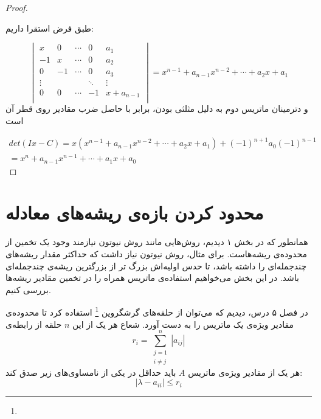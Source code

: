 \begin{proof}
\begin{equation}
  \end{equation}

  طبق فرض استقرا داریم:

  \begin{equation}
    \begin{vmatrix}
      x & 0 & \cdots & 0 & a_1 \\
      -1 & x & \cdots & 0 & a_2 \\
      0 & -1 & \cdots & 0 & a_3 \\
      \vdots &  &  & \ddots & \vdots \\
      0 & 0 & \cdots & -1 & x + a_{n-1} \\
    \end{vmatrix}
    = x^{n-1} + a_{n-1}x^{n-2} + \cdots + a_2 x + a_1
  \end{equation}
  و دترمینان ماتریس دوم به دلیل مثلثی بودن، برابر با حاصل ضرب مقادیر روی قطر آن است

  \begin{equation}
    \begin{split}
        det(Ix - C) = x (x^{n-1} + a_{n-1}x^{n-2} + \cdots + a_2 x + a_1) + (-1)^{n + 1} a_0 (-1)^{n-1} \\
        = x^n + a_{n-1} x^{n-1} + \cdots + a_1x + a_0
    \end{split}
  \end{equation}

\end{proof}


\section{محدود کردن بازه‌ی ریشه‌های معادله}

همانطور که در بخش ۱ دیدیم، روش‌هایی مانند روش نیوتون نیازمند وجود یک تخمین از محدوده‌ی ریشه‌هاست.
برای مثال، روش نیوتون نیاز داشت که حداکثر مقدار ریشه‌های چندجمله‌ای را داشته باشد، تا حدس اولیه‌اش بزرگ تر از بزرگترین ریشه‌ی چندجمله‌ای باشد.
در این بخش می‌خواهیم استفاده‌ی ماتریس همراه را در تخمین مقادیر ریشه‌ها بررسی کنیم.

در فصل ۵ درس، دیدیم که می‌توان از حلقه‌های گرشگروین
\footnote{}
استفاده کرد تا محدوده‌ی مقادیر ویژه‌ی یک ماتریس را به دست آورد.
شعاع هر یک از این
$n$
حلقه از رابطه‌ی
\begin{equation}
  r_i = \sum\limits_{
    \substack{
      j = 1 \\
      i \ne j
    }
  }^{n} |a_{ij}|
\end{equation}
هر یک از مقادیر ویژه‌ی ماتریس
$A$
باید حداقل در یکی از نامساوی‌های زیر صدق کند:
\begin{equation}
  | \lambda - a_{ii} | \le r_i
\end{equation}


